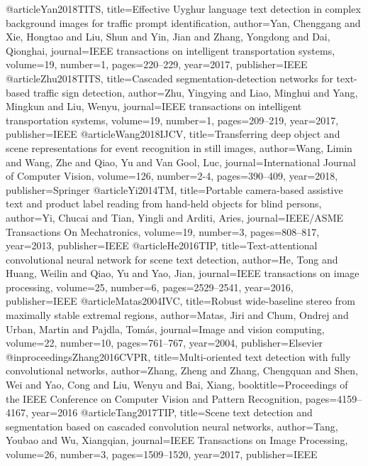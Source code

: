 @article{Yan2018TITS,
  title={Effective Uyghur language text detection in complex background images for traffic prompt identification},
  author={Yan, Chenggang and Xie, Hongtao and Liu, Shun and Yin, Jian and Zhang, Yongdong and Dai, Qionghai},
  journal={IEEE transactions on intelligent transportation systems},
  volume={19},
  number={1},
  pages={220--229},
  year={2017},
  publisher={IEEE}
}
@article{Zhu2018TITS,
  title={Cascaded segmentation-detection networks for text-based traffic sign detection},
  author={Zhu, Yingying and Liao, Minghui and Yang, Mingkun and Liu, Wenyu},
  journal={IEEE transactions on intelligent transportation systems},
  volume={19},
  number={1},
  pages={209--219},
  year={2017},
  publisher={IEEE}
}
@article{Wang2018IJCV,
  title={Transferring deep object and scene representations for event recognition in still images},
  author={Wang, Limin and Wang, Zhe and Qiao, Yu and Van Gool, Luc},
  journal={International Journal of Computer Vision},
  volume={126},
  number={2-4},
  pages={390--409},
  year={2018},
  publisher={Springer}
}
@article{Yi2014TM,
  title={Portable camera-based assistive text and product label reading from hand-held objects for blind persons},
  author={Yi, Chucai and Tian, Yingli and Arditi, Aries},
  journal={IEEE/ASME Transactions On Mechatronics},
  volume={19},
  number={3},
  pages={808--817},
  year={2013},
  publisher={IEEE}
}
@article{He2016TIP,
  title={Text-attentional convolutional neural network for scene text detection},
  author={He, Tong and Huang, Weilin and Qiao, Yu and Yao, Jian},
  journal={IEEE transactions on image processing},
  volume={25},
  number={6},
  pages={2529--2541},
  year={2016},
  publisher={IEEE}
}
@article{Matas2004IVC,
  title={Robust wide-baseline stereo from maximally stable extremal regions},
  author={Matas, Jiri and Chum, Ondrej and Urban, Martin and Pajdla, Tom{\'a}s},
  journal={Image and vision computing},
  volume={22},
  number={10},
  pages={761--767},
  year={2004},
  publisher={Elsevier}
}
@inproceedings{Zhang2016CVPR,
  title={Multi-oriented text detection with fully convolutional networks},
  author={Zhang, Zheng and Zhang, Chengquan and Shen, Wei and Yao, Cong and Liu, Wenyu and Bai, Xiang},
  booktitle={Proceedings of the IEEE Conference on Computer Vision and Pattern Recognition},
  pages={4159--4167},
  year={2016}
}
@article{Tang2017TIP,
  title={Scene text detection and segmentation based on cascaded convolution neural networks},
  author={Tang, Youbao and Wu, Xiangqian},
  journal={IEEE Transactions on Image Processing},
  volume={26},
  number={3},
  pages={1509--1520},
  year={2017},
  publisher={IEEE}
}
